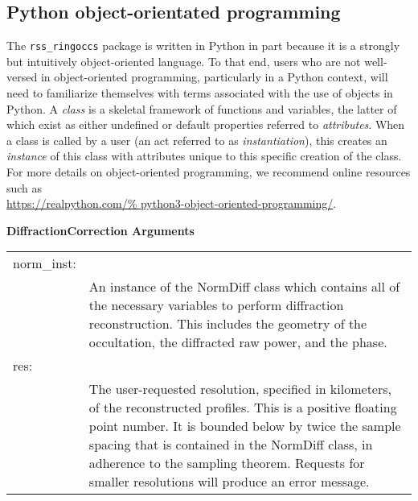 \subsection{Python object-orientated programming}
    The \texttt{rss\_ringoccs} package is written in Python
    in part because it is a strongly but intuitively
    object-oriented language. To that end, users who are
    not well-versed in object-oriented programming,
    particularly in a Python context, will need to
    familiarize themselves with terms associated
    with the use of objects in Python. A \textit{class}
    is a skeletal framework of functions and variables,
    the latter of which exist as either undefined or
    default properties referred to \textit{attributes}.
    When a class is called by a user (an act referred to
    as \textit{instantiation}), this creates an
    \textit{instance} of this class
    with attributes unique to this specific creation
    of the class. For more details on object-oriented
    programming, we recommend online resources such as\\
    \url{https://realpython.com/%
         python3-object-oriented-programming/}.
            \par\hfill\par
            \textbf{DiffractionCorrection Arguments}
            \begin{table}[H]
                \centering
                \begin{tabular}{lp{5in}}
                    norm\_inst:&\\
                    &An instance of the NormDiff class which
                     contains all of the necessary variables
                     to perform diffraction reconstruction.
                     This includes the geometry of the
                     occultation, the diffracted raw power,
                     and the phase.\\
                    res:&\\
                    &The user-requested resolution,
                     specified in kilometers, of the reconstructed
                     profiles. This is a positive floating point
                     number. It is bounded below by twice
                     the sample spacing that is contained in the
                     NormDiff class, in adherence to the
                     sampling theorem. Requests for smaller
                     resolutions will produce an error message.\\
                \end{tabular}
            \end{table}

